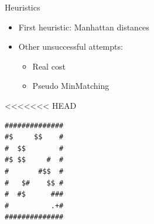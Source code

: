 \documentclass{beamer}
\begin{document}
\begin{frame}{Heuristics}
  \begin{itemize}
    \item First heuristic: Manhattan distances
    \item Other unsuccessful attempts:
    \begin{itemize}
      \item Real cost
      \item Pseudo MinMatching
    \end{itemize}
  \end{itemize}
\end{frame}

<<<<<<< HEAD
\begin{lrbox}{\maplocked}
  \begin{minipage}{.25\textwidth}
\centering
\begin{BVerbatim}
##############
#$     $$    #
#  $$        #
#$ $$     #  #
#       #$$  #
#   $#    $$ #
#  #$      ###
#          .+#
##############
\end{BVerbatim}
  \end{minipage}
\end{lrbox}%
\end{document}
